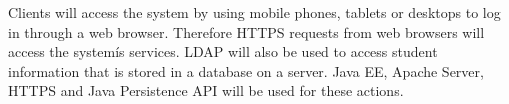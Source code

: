 Clients will access the system by using mobile phones, tablets or desktops to log in through a web browser. Therefore HTTPS requests from web browsers will access the systemís services. LDAP will also be used to access student information that is stored in a database on a server. Java EE, Apache Server, HTTPS and Java Persistence API will be used for these actions.